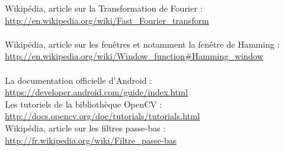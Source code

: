 \noindent
Wikipédia, article sur la Transformation de Fourier :
\url{http://en.wikipedia.org/wiki/Fast_Fourier_transform}\\
\\
Wikipédia, article sur les fenêtres et notamment la fenêtre de Hamming : 
\url{http://en.wikipedia.org/wiki/Window_function#Hamming_window}\\
\\
La documentation officielle d'Android : \url{https://developer.android.com/guide/index.html}\\

Les tutoriels de la bibliothèque OpenCV : \url{http://docs.opencv.org/doc/tutorials/tutorials.html}\\

Wikipédia, article sur les filtres passe-bas : \url{http://fr.wikipedia.org/wiki/Filtre_passe-bas}
